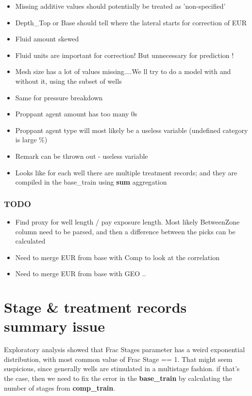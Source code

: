 \documentclass[11pt]{article}
\providecommand{\tightlist}{%
      \setlength{\itemsep}{0pt}\setlength{\parskip}{0pt}}
\begin{document}
\begin{itemize}
\tightlist
\item
  Missing additive values should potentially be treated as
  'non-specified'
\item
  Depth\_Top or Base should tell where the lateral starts for correction
  of EUR
\item
  Fluid amount skewed
\item
  Fluid units are important for correction! But unnecessary for
  prediction !
\item
  Mesh size has a lot of values missing....We ll try to do a model with
  and without it, using the subset of wells
\item
  Same for pressure breakdown
\item
  Proppant agent amount has too many 0s
\item
  Proppant agent type will most likely be a useless variable (undefined
  category is large \%)
\item
  Remark can be thrown out - useless variable
\item
  Looks like for each well there are multiple treatment records; and
  they are compiled in the base\_train using \textbf{sum} aggregation
\end{itemize}

\subsubsection{TODO}\label{todo}

\begin{itemize}
\tightlist
\item
  Find proxy for well length / pay exposure length. Most likely
  BetweenZone column need to be parsed, and then a difference between
  the picks can be calculated
\item
  Need to merge EUR from base with Comp to look at the correlation
\item
  Need to merge EUR from base with GEO ..
\end{itemize}

    \section{Stage \& treatment records summary
issue}\label{stage-treatment-records-summary-issue}

Exploratory analysis showed that Frac Stages parameter has a weird
exponential distribution, with most common value of Frac Stage == 1.
That might seem suspicious, since generally wells are stimulated in a
multistage fashion. if that's the case, then we need to fix the error in
the \textbf{base\_train} by calculating the number of stages from
\textbf{comp\_train}.
\end{document}
